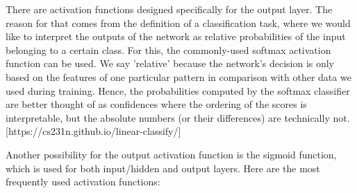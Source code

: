 There are activation functions designed specifically for the output layer. The reason for that comes from the definition of a classification task, where we would like to interpret the outputs of the network as relative probabilities of the input belonging to a certain class. For this, the commonly-used softmax activation function can be used. We say 'relative' because the network's decision is only based on the features of one particular pattern in comparison with other data we used during training. Hence, the probabilities computed by the softmax classifier are better thought of as confidences where the ordering of the scores is interpretable, but the absolute numbers (or their differences) are technically not. [https://cs231n.github.io/linear-classify/]

Another possibility for the output activation function is the sigmoid function, which is used for both input/hidden and output layers. Here are the most frequently used activation functions:

